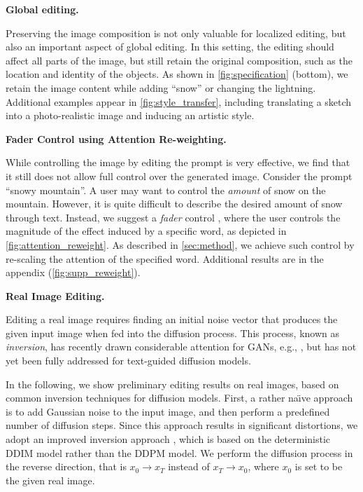 \textbf{Global editing.}

Preserving the image composition is not only valuable for localized editing, but also an important aspect of global editing. In this setting, the editing should affect all parts of the image, but still retain the original composition, such as the location and identity of the objects. As shown in \ref{fig:specification} (bottom), we retain the image content while adding ``snow'' or changing the lightning. Additional examples appear in \ref{fig:style_transfer}, including translating a sketch into a photo-realistic image and inducing an artistic style. 

\textbf{Fader Control using Attention Re-weighting.}

While controlling the image by editing the prompt is very effective, we find that it still does not allow full control over the generated image. Consider the prompt ``snowy mountain''. A user may want to control the \emph{amount} of snow on the mountain. However, it is quite difficult to describe the desired amount of snow through text. Instead, we suggest a \emph{fader} control \cite{lample2017fader}, where the user controls the magnitude of the effect induced by a specific word, as depicted in \ref{fig:attention_reweight}. As described in \ref{sec:method}, we achieve such control by re-scaling the attention of the specified word. Additional results are in the appendix (\ref{fig:supp_reweight}).

\textbf{Real Image Editing.}

Editing a real image requires finding an initial noise vector that produces the given input image when fed into the diffusion process. This process, known as \textit{inversion}, has recently drawn considerable attention for GANs, e.g., \cite{zhu2016generative, abdal2019image2stylegan, alaluf2022hyperstyle, roich2021pivotal, zhu2020domain, tov2021designing, Wang2021HighFidelityGI, xia2021gan}, but has not yet been fully addressed for text-guided diffusion models.

In the following, we show preliminary editing results on real images, based on common inversion techniques for diffusion models. First, a rather na\"{\i}ve approach is to add Gaussian noise to the input image, and then perform a predefined number of diffusion steps. Since this approach results in significant distortions, we adopt an improved inversion approach \cite{dhariwal2021diffusion,song2020denoising}, which is based on the deterministic DDIM model rather than the DDPM model. We perform the diffusion process in the reverse direction, that is $x_0 \longrightarrow x_T$ instead of $x_T \longrightarrow x_0$, where $x_0$ is set to be the given real image.

